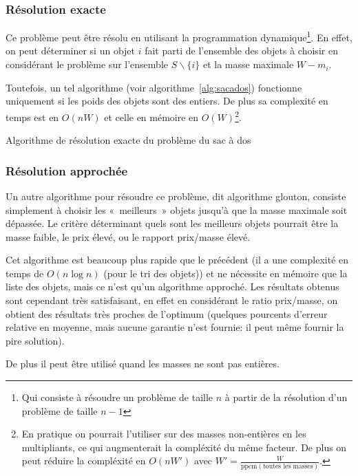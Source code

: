   \subsubsection{Résolution exacte}
    Ce problème peut être résolu en utilisant la programmation
    dynamique\footnote{Qui consiste à résoudre un problème de taille $n$ à
    partir de la résolution d'un problème de taille $n-1$}. En effet, on peut
    déterminer si un objet $i$ fait parti de l'ensemble des objets à choisir en
    considérant le problème sur l'ensemble $S\backslash\{i\}$ et la masse
    maximale $W-m_i$.
    
    Toutefois, un tel algorithme (voir algorithme~\ref{alg:sacados}) fonctionne
    uniquement si les poids des objets
    sont des entiers. De plus sa complexité en temps est en $O(nW)$ et celle en
    mémoire en $O(W)$\footnote{En pratique on pourrait l'utiliser sur des
    masses non-entières en les multipliants, ce qui augmenterait la compléxité
    du même facteur. De plus on peut réduire la compléxité en $O(nW')$ avec
    $W' = \frac W {\mathrm{ppcm}(\text{toutes les masses})}$.}.

    \begin{algorithm}
      \caption{Algorithme de résolution exacte du problème du sac à dos}
      \label{alg:sacados}
    \end{algorithm}

  \subsubsection{Résolution approchée}
    Un autre algorithme pour résoudre ce problème, dit algorithme glouton,
    consiste simplement à choisir les «~meilleurs~» objets jusqu'à que la masse
    maximale soit dépassée. Le critère déterminant quels sont les meilleurs
    objets pourrait être la masse faible, le prix élevé, ou le rapport
    prix/masse élevé.

    Cet algorithme est beaucoup plus rapide que le précédent (il a une
    complexité en temps de $O(n \log n)$ (pour le tri des objets)) et ne
    nécessite en mémoire que la liste des objets, mais ce n'est qu'un algorithme
    approché. Les résultats obtenus sont cependant très satisfaisant, en effet
    en considérant le ratio \nobreak prix/masse, on obtient des résultats très
    proches de l'optimum (quelques pourcents d'erreur relative en moyenne, mais
    aucune garantie n'est fournie: il peut même fournir la pire solution).

    De plus il peut être utilisé quand les masses ne sont pas entières.

